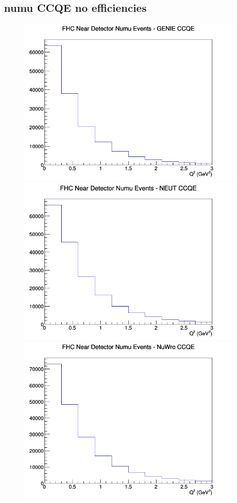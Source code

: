 \documentclass[12pt]{article}
\begin{document}
\subsection{numu CCQE no efficiencies}
\begin{figure}[h]
\includegraphics[width=\linewidth]{Q2/nominal/CCQE_FHC_ND_numu_Q2_GENIE.png}
\endminipage
{}
\includegraphics[width=\linewidth]{Q2/nominal/CCQE_FHC_ND_numu_Q2_NEUT.png}
\endminipage
{}
\includegraphics[width=\linewidth]{Q2/nominal/CCQE_FHC_ND_numu_Q2_NuWro.png}

\end{figure}
\end{document}
